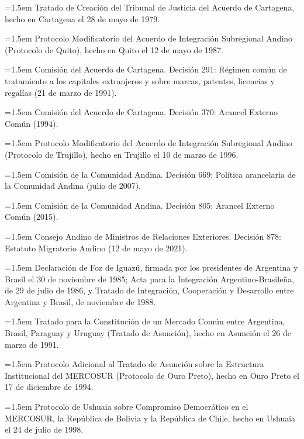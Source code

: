 \documentclass[10pt,a4paper]{article}
\begin{document}
\noindent\hangindent=1.5em Tratado de Creación del Tribunal de Justicia del Acuerdo de Cartagena, hecho en Cartagena el 28 de mayo de 1979.

\noindent\hangindent=1.5em Protocolo Modificatorio del Acuerdo de Integración Subregional Andino (Protocolo de Quito), hecho en Quito el 12 de mayo de 1987.

\noindent\hangindent=1.5em Comisión del Acuerdo de Cartagena. Decisión 291: Régimen común de tratamiento a los capitales extranjeros y sobre marcas, patentes, licencias y regalías (21 de marzo de 1991).

\noindent\hangindent=1.5em Comisión del Acuerdo de Cartagena. Decisión 370: Arancel Externo Común (1994).

\noindent\hangindent=1.5em Protocolo Modificatorio del Acuerdo de Integración Subregional Andino (Protocolo de Trujillo), hecho en Trujillo el 10 de marzo de 1996.

\noindent\hangindent=1.5em Comisión de la Comunidad Andina. Decisión 669: Política arancelaria de la Comunidad Andina (julio de 2007).

\noindent\hangindent=1.5em Comisión de la Comunidad Andina. Decisión 805: Arancel Externo Común (2015).

\noindent\hangindent=1.5em Consejo Andino de Ministros de Relaciones Exteriores. Decisión 878: Estatuto Migratorio Andino (12 de mayo de 2021).

\noindent\hangindent=1.5em Declaración de Foz de Iguazú, firmada por los presidentes de Argentina y Brasil el 30 de noviembre de 1985; Acta para la Integración Argentino-Brasileña, de 29 de julio de 1986, y Tratado de Integración, Cooperación y Desarrollo entre Argentina y Brasil, de noviembre de 1988.

\noindent\hangindent=1.5em Tratado para la Constitución de un Mercado Común entre Argentina, Brasil, Paraguay y Uruguay (Tratado de Asunción), hecho en Asunción el 26 de marzo de 1991.

\noindent\hangindent=1.5em Protocolo Adicional al Tratado de Asunción sobre la Estructura Institucional del MERCOSUR (Protocolo de Ouro Preto), hecho en Ouro Preto el 17 de diciembre de 1994.

\noindent\hangindent=1.5em Protocolo de Ushuaia sobre Compromiso Democrático en el MERCOSUR, la República de Bolivia y la República de Chile, hecho en Ushuaia el 24 de julio de 1998.
\end{document}
